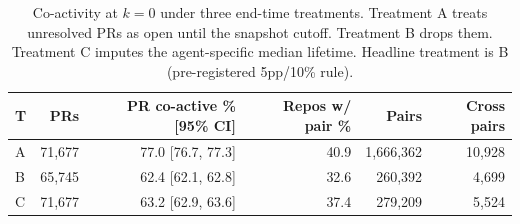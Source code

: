 \begin{table}[t]
\centering
\caption{Co-activity at $k{=}0$ under three end-time treatments. Treatment A treats unresolved PRs as open until the snapshot cutoff. Treatment B drops them. Treatment C imputes the agent-specific median lifetime. Headline treatment is B (pre-registered 5pp/10\% rule).}
\label{tab:prevalence}
\begin{tabular}{l r r r r r}
\hline
T & PRs & PR co-active \% [95\% CI] & Repos w/ pair \% & Pairs & Cross pairs \\
\hline
A & 71,677 & 77.0 [76.7, 77.3] & 40.9 & 1,666,362 & 10,928 \\
B & 65,745 & 62.4 [62.1, 62.8] & 32.6 & 260,392 & 4,699 \\
C & 71,677 & 63.2 [62.9, 63.6] & 37.4 & 279,209 & 5,524 \\
\hline
\end{tabular}
\end{table}

